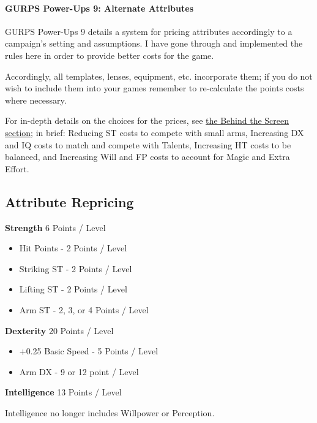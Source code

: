 \begin{multicols*}{3}
	\paragraph{GURPS Power-Ups 9: Alternate Attributes \label{PU9}}
	GURPS Power-Ups 9 details a system for pricing attributes accordingly to a campaign's setting and assumptions. I have gone through and implemented the rules here in order to provide better costs for the game. 
	
	Accordingly, all templates, lenses, equipment, etc. incorporate them; if you do not wish to include them into your games remember to re-calculate the points costs where necessary.
	
	For in-depth details on the choices for the prices, see \hyperref[behind_the_screen]{the Behind the Screen section}; in brief: Reducing ST costs to compete with small arms, Increasing DX and IQ costs to match and compete with Talents, Increasing HT costs to be balanced, and Increasing Will and FP costs to account for Magic and Extra Effort.
	
	\begin{coloredbox}
		
	\subsection*{Attribute Repricing}
	\raggedright
	
	\noindent\textbf{Strength}
	6 Points / Level
	
	\begin{itemize}
		\itemsep0em 
		\item Hit Points - 2 Points / Level
		\item Striking ST - 2 Points / Level
		\item Lifting ST - 2 Points / Level
		\item Arm ST - 2, 3, or 4 Points / Level
	\end{itemize}
	
	\noindent\textbf{Dexterity}
	20 Points / Level
	
	\begin{itemize}
		\itemsep0em 
		\item +0.25 Basic Speed - 5 Points / Level
		\item Arm DX - 9 or 12 point / Level
	\end{itemize}
	
	\noindent\textbf{Intelligence}
	13 Points / Level
	
	\noindent
	Intelligence no longer includes Willpower or Perception.
	

\end{coloredbox}
\end{multicols*}
